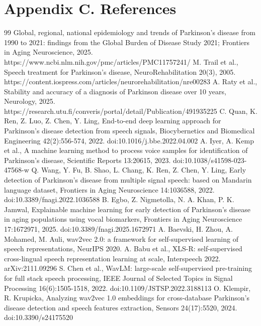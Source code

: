 \documentclass[11pt,a4paper]{article}
\begin{document}
\section*{Appendix C. References}
\begin{thebibliography}{99}\setlength{\itemsep}{1pt}\small
{} Global, regional, national epidemiology and trends of Parkinson's disease from 1990 to 2021: findings from the Global Burden of Disease Study 2021; Frontiers in Aging Neuroscience, 2025. https://www.ncbi.nlm.nih.gov/pmc/articles/PMC11757241/
 M. Trail et al., Speech treatment for Parkinson's disease, NeuroRehabilitation 20(3), 2005. https://content.iospress.com/articles/neurorehabilitation/nre00283
 A. Raty et al., Stability and accuracy of a diagnosis of Parkinson disease over 10 years, Neurology, 2025. https://research.utu.fi/converis/portal/detail/Publication/491935225
 C. Quan, K. Ren, Z. Luo, Z. Chen, Y. Ling, End-to-end deep learning approach for Parkinson's disease detection from speech signals, Biocybernetics and Biomedical Engineering 42(2):556-574, 2022. doi:10.1016/j.bbe.2022.04.002
 A. Iyer, A. Kemp et al., A machine learning method to process voice samples for identification of Parkinson's disease, Scientific Reports 13:20615, 2023. doi:10.1038/s41598-023-47568-w
 Q. Wang, Y. Fu, B. Shao, L. Chang, K. Ren, Z. Chen, Y. Ling, Early detection of Parkinson's disease from multiple signal speech: based on Mandarin language dataset, Frontiers in Aging Neuroscience 14:1036588, 2022. doi:10.3389/fnagi.2022.1036588
 B. Egbo, Z. Nigmetolla, N. A. Khan, P. K. Jamwal, Explainable machine learning for early detection of Parkinson's disease in aging populations using vocal biomarkers, Frontiers in Aging Neuroscience 17:1672971, 2025. doi:10.3389/fnagi.2025.1672971
 A. Baevski, H. Zhou, A. Mohamed, M. Auli, wav2vec 2.0: a framework for self-supervised learning of speech representations, NeurIPS 2020.
 A. Babu et al., XLS-R: self-supervised cross-lingual speech representation learning at scale, Interspeech 2022. arXiv:2111.09296
 S. Chen et al., WavLM: large-scale self-supervised pre-training for full stack speech processing, IEEE Journal of Selected Topics in Signal Processing 16(6):1505-1518, 2022. doi:10.1109/JSTSP.2022.3188113
 O. Klempir, R. Krupicka, Analyzing wav2vec 1.0 embeddings for cross-database Parkinson's disease detection and speech features extraction, Sensors 24(17):5520, 2024. doi:10.3390/s24175520

\end{thebibliography}
\end{document}
